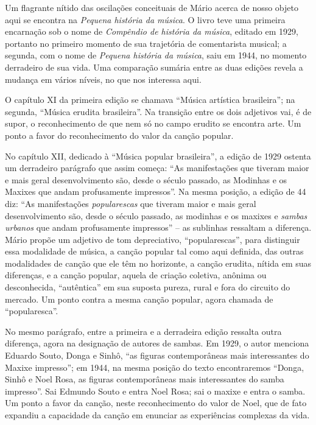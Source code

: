 Um flagrante nítido das oscilações conceituais de Mário acerca de nosso
objeto aqui se encontra na \emph{Pequena história da música}. O livro
teve uma primeira encarnação sob o nome de \emph{Compêndio de história
da música}, editado em 1929, portanto no primeiro momento de sua
trajetória de comentarista musical; a segunda, com o nome de
\emph{Pequena história da música}, saiu em 1944, no momento derradeiro
de sua vida. Uma comparação sumária entre as duas edições revela a
mudança em vários níveis, no que nos interessa aqui.

O capítulo XI da primeira edição se chamava ``Música artística
brasileira''; na segunda, ``Música erudita brasileira''. Na transição
entre os dois adjetivos vai, é de supor, o reconhecimento de que nem só
no campo erudito se encontra arte. Um ponto a favor do reconhecimento do
valor da canção popular.

No capítulo XII, dedicado à ``Música popular brasileira'', a edição de
1929 ostenta um derradeiro parágrafo que assim começa: ``As
manifestações que
tiveram maior e mais geral desenvolvimento são, desde o século passado,
as Modinhas e os Maxixes que andam profusamente impressos''. Na mesma
posição, a edição de 44 diz: ``As manifestações \emph{popularescas} que
tiveram maior e mais geral desenvolvimento são, desde o século passado,
as modinhas e os maxixes e \emph{sambas urbanos} que andam profusamente
impressos'' -- as sublinhas ressaltam a diferença. Mário propõe um
adjetivo de tom depreciativo, ``popularescas'', para distinguir essa
modalidade de música, a canção popular tal como aqui definida, das
outras modalidades de canção que ele têm no horizonte, a canção erudita,
nítida em suas diferenças, e a canção popular, aquela de criação
coletiva, anônima ou desconhecida, ``autêntica'' em sua suposta pureza,
rural e fora do circuito do mercado. Um ponto contra a mesma canção
popular, agora chamada de ``popularesca''.

No mesmo parágrafo, entre a primeira e a derradeira edição ressalta
outra diferença, agora na designação de autores de sambas. Em 1929, o
autor menciona Eduardo Souto, Donga e Sinhô, ``as figuras contemporâneas
mais interessantes do Maxixe impresso''; em 1944, na mesma posição do
texto encontraremos ``Donga, Sinhô e Noel Rosa, as figuras
contemporâneas mais interessantes do samba impresso''. Sai Edmundo Souto
e entra Noel Rosa; sai o maxixe e entra o samba. Um ponto a favor da
canção, neste reconhecimento do valor de Noel, que de fato expandiu a
capacidade da canção em enunciar as experiências complexas da vida.

